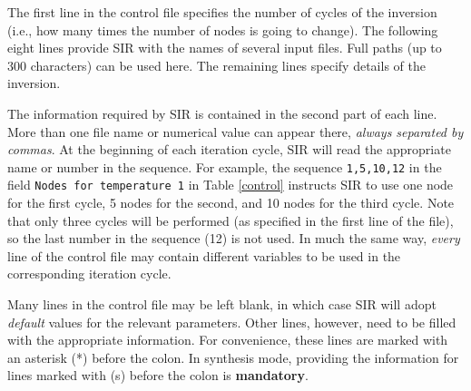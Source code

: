 The first line in the control file specifies the number of cycles of
the inversion (i.e., how many times the number of nodes is going to
change). The following eight lines provide SIR with the names of 
several input files. Full paths (up to 300 characters) can be used
here. The remaining lines specify details of the inversion.

The information required by SIR is contained in the second part of each
line. More than one file name or numerical value can appear there, {\em
always separated by commas}. At the beginning of each iteration cycle,
SIR will read the appropriate name or number in the sequence. For
example, the sequence {\tt 1,5,10,12} in the field {\tt Nodes for
temperature 1} in Table \ref{control} instructs SIR to use one node for
the first cycle, 5 nodes for the second, and 10 nodes for the third
cycle. Note that only three cycles will be performed (as specified in
the first line of the file), so the last number in the sequence (12) is
not used. In much the same way, {\em every} line of the control file
may contain different variables to be used in the corresponding
iteration cycle.

Many lines in the control file may be left blank, in which case SIR
will adopt {\em default} values for the relevant parameters. Other lines,
however, need to be filled with the appropriate information. For
convenience, these lines are marked with an asterisk (*) before the
colon. In synthesis mode, providing the information for lines marked
with (s) before the colon is {\bf mandatory}.

